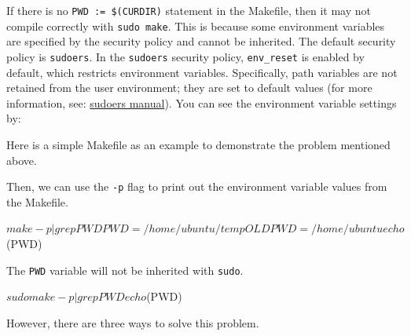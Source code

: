 \documentclass[10pt, oneside]{book}
\begin{document}
If there is no \verb|PWD := $(CURDIR)| statement in the Makefile, then it may not compile correctly with \verb|sudo make|.
This is because some environment variables are specified by the security policy and cannot be inherited.
The default security policy is \verb|sudoers|.
In the \verb|sudoers| security policy, \verb|env_reset| is enabled by default, which restricts environment variables.
Specifically, path variables are not retained from the user environment;
they are set to default values (for more information, see: \href{https://www.sudo.ws/docs/man/sudoers.man/}{sudoers manual}).
You can see the environment variable settings by:


Here is a simple Makefile as an example to demonstrate the problem mentioned above.


Then, we can use the \verb|-p| flag to print out the environment variable values from the Makefile.

\begin{codebash}
$ make -p | grep PWD
PWD = /home/ubuntu/temp
OLDPWD = /home/ubuntu
	echo $(PWD)
\end{codebash}

The \verb|PWD| variable will not be inherited with \verb|sudo|.

\begin{codebash}
$ sudo make -p | grep PWD
	echo $(PWD)
\end{codebash}

However, there are three ways to solve this problem.
\end{document}
